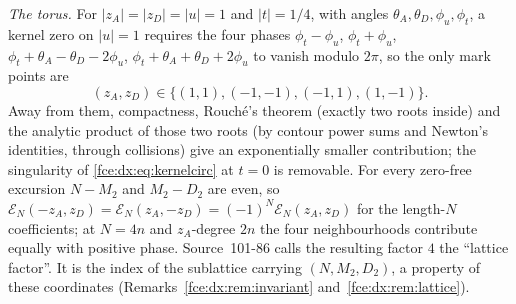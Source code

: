 \documentclass[11pt,a4paper]{article}
\numberwithin{equation}{section}
\theoremstyle{definition}\newtheorem{definition}[theorem]{Definition}
\theoremstyle{remark}\newtheorem{remark}[theorem]{Remark}
\newcommand{\E}{\mathcal E}
\begin{document}
\emph{The torus.} For $|z_A|=|z_D|=|u|=1$ and $|t|=1/4$, with angles
$\theta_A,\theta_D,\phi_u,\phi_t$, a kernel zero on $|u|=1$ requires the four
phases $\phi_t-\phi_u$, $\phi_t+\phi_u$, $\phi_t+\theta_A-\theta_D-2\phi_u$,
$\phi_t+\theta_A+\theta_D+2\phi_u$ to vanish modulo $2\pi$, so the only mark
points are
\begin{equation}\label{fce:dx:eq:four}
 (z_A,z_D)\in\{(1,1),(-1,-1),(-1,1),(1,-1)\}.
\end{equation}
Away from them, compactness, Rouch\'e's theorem (exactly two roots inside)
and the analytic product of those two roots (by contour power sums and
Newton's identities, through collisions) give an exponentially smaller
contribution; the singularity of \eqref{fce:dx:eq:kernelcirc} at $t=0$ is
removable. For every zero-free excursion $N-M_2$ and $M_2-D_2$ are even, so
$\E_N(-z_A,z_D)=\E_N(z_A,-z_D)=(-1)^N\E_N(z_A,z_D)$ for the length-$N$
coefficients; at $N=4n$ and $z_A$-degree $2n$ the four neighbourhoods
contribute equally with positive phase. Source~101-86 calls the resulting
factor $4$ the ``lattice factor''. It is the index of the sublattice carrying
$(N,M_2,D_2)$, a property of these coordinates
(Remarks~\ref{fce:dx:rem:invariant} and~\ref{fce:dx:rem:lattice}).
\end{document}
